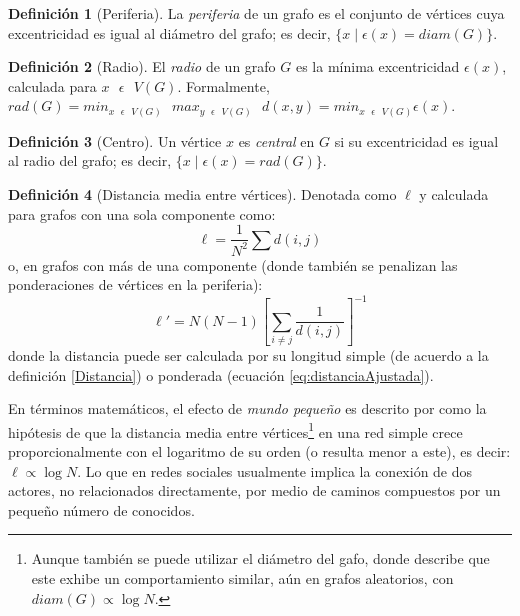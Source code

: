 \documentclass[letterpaper, 11pt]{book}
\theoremstyle{definition}
\newtheorem{definition}{Definición}[chapter]
\theoremstyle{remark}
\begin{document}
\begin{definition}[Periferia]
\label{Periferia}
	La \emph{periferia} de un grafo es el conjunto de vértices cuya excentricidad es igual al diámetro del grafo; es decir, $\{x \mid \epsilon(x) = diam(G)\}$.
\end{definition}


\begin{definition}[Radio]
\label{Radio}
	El \emph{radio} de un grafo $G$ es la mínima excentricidad $\epsilon(x)$, calculada para $x \text{ } \epsilon \text{ } V(G)$. Formalmente, $rad(G) = min_{x \text{ } \epsilon \text{ } V(G)} \text{ } max_{y \text{ } \epsilon \text{ } V(G)} \text{ } d(x, y) = min_{x \text{ } \epsilon \text{ } V(G)} \epsilon(x) $.
\end{definition}


\begin{definition}[Centro]
\label{Centro}
	Un vértice $x$ es \emph{central} en $G$ si su excentricidad es igual al radio del grafo; es decir, $\{x \mid \epsilon(x) = rad(G)\}$.
\end{definition}

\begin{definition}[Distancia media entre vértices]
\label{Distancia media entre vértices}
    Denotada como $\ell$ y calculada para grafos con una sola componente como: 
    \begin{equation}\label{dist_media_1c}
	\ell=\frac{1}{N^2}\sum d(i,j)
    \end{equation} 
    o, en grafos con más de una componente (donde también se penalizan las ponderaciones de vértices en la periferia):
    \begin{equation}\label{dist_media_mc}
	\ell'=N(N-1) \left[ \sum_{i \neq j} \frac{1}{d(i,j)} \right]^{-1}
    \end{equation} 
    donde la distancia puede ser calculada por su longitud simple (de acuerdo a la definición \ref{Distancia}) o ponderada (ecuación \ref{eq:distanciaAjustada}).
\end{definition}

En términos matemáticos, el efecto de \emph{mundo pequeño} es descrito por \citet{2010_Newman_Networks} como la hipótesis de que la distancia media entre vértices\footnote{
    Aunque también se puede utilizar el diámetro del gafo, donde \citet{2010_Newman_Networks} describe que este exhibe un comportamiento similar, aún en grafos aleatorios, con $diam(G) \propto \log N$. 
} en una red simple crece proporcionalmente con el logaritmo de su orden (o resulta menor a este), es decir: $\ell \propto \log N$. 
Lo que en redes sociales usualmente implica la conexión de dos actores, no relacionados directamente, por medio de caminos compuestos por un pequeño número de conocidos. 
\end{document}
